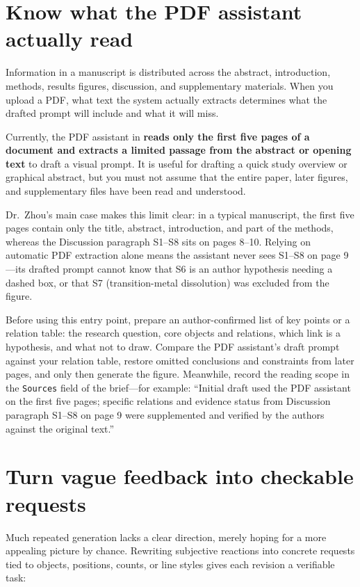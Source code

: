 \section{Know what the PDF assistant actually read}

Information in a manuscript is distributed across the abstract, introduction, methods, results figures, discussion, and supplementary materials. When you upload a PDF, what text the system actually extracts determines what the drafted prompt will include and what it will miss.

Currently, the PDF assistant in \scidraw{} \textbf{reads only the first five pages of a document and extracts a limited passage from the abstract or opening text} to draft a visual prompt. It is useful for drafting a quick study overview or graphical abstract, but you must not assume that the entire paper, later figures, and supplementary files have been read and understood.

Dr.\ Zhou's main case makes this limit clear: in a typical manuscript, the first five pages contain only the title, abstract, introduction, and part of the methods, whereas the Discussion paragraph S1--S8 sits on pages 8--10. Relying on automatic PDF extraction alone means the assistant never sees S1--S8 on page 9---its drafted prompt cannot know that S6 is an author hypothesis needing a dashed box, or that S7 (transition-metal dissolution) was excluded from the figure.

Before using this entry point, prepare an author-confirmed list of key points or a relation table: the research question, core objects and relations, which link is a hypothesis, and what not to draw. Compare the PDF assistant's draft prompt against your relation table, restore omitted conclusions and constraints from later pages, and only then generate the figure. Meanwhile, record the reading scope in the \texttt{Sources} field of the brief---for example: ``Initial draft used the PDF assistant on the first five pages; specific relations and evidence status from Discussion paragraph S1--S8 on page 9 were supplemented and verified by the authors against the original text.''

\section{Turn vague feedback into checkable requests}

Much repeated generation lacks a clear direction, merely hoping for a more appealing picture by chance. Rewriting subjective reactions into concrete requests tied to objects, positions, counts, or line styles gives each revision a verifiable task:

